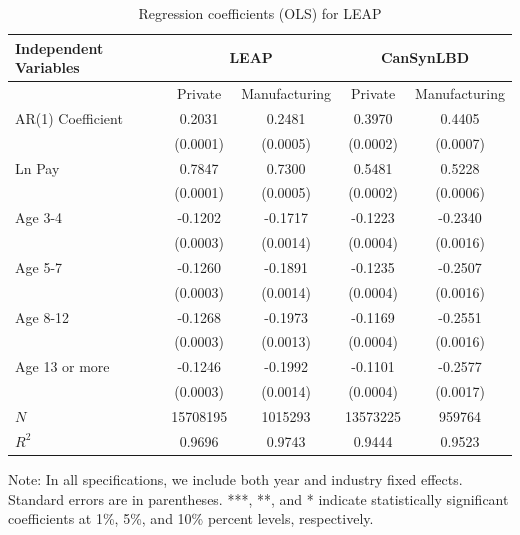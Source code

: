 \documentclass[10pt,twoside]{article}
\newcommand{\sym}[1]{\rlap{#1}}
\begin{document}
\begin{table}[H]
  \centering
\begin{threeparttable}
 \caption{Regression coefficients (OLS) for LEAP} \label{tab:OLS_can} \medskip
\renewcommand{\arraystretch}{1}
\begin{tabular}{l|c c| c c}
\toprule
\textbf{Independent Variables}&\multicolumn{2}{c|}{\textbf{LEAP}} &  \multicolumn{2}{c}{\textbf{CanSynLBD}}\\
\midrule
&\multicolumn{1}{c}{Private}&\multicolumn{1}{c}{Manufacturing}&\multicolumn{1}{c}{Private}&\multicolumn{1}{c}{Manufacturing}\\
\hline
AR(1) Coefficient&   0.2031\sym{***}&   0.2481\sym{***}&   0.3970\sym{***}&   0.4405\sym{***}\\
          & (0.0001)         & (0.0005)         & (0.0002)         & (0.0007)         \\
[1em]
Ln Pay    &   0.7847\sym{***}&   0.7300\sym{***}&   0.5481\sym{***}&   0.5228\sym{***}\\
          & (0.0001)         & (0.0005)         & (0.0002)         & (0.0006)         \\
[1em]
Age 3-4   &  -0.1202\sym{***}&  -0.1717\sym{***}&  -0.1223\sym{***}&  -0.2340\sym{***}\\
          & (0.0003)         & (0.0014)         & (0.0004)         & (0.0016)         \\
[1em]
Age 5-7   &  -0.1260\sym{***}&  -0.1891\sym{***}&  -0.1235\sym{***}&  -0.2507\sym{***}\\
          & (0.0003)         & (0.0014)         & (0.0004)         & (0.0016)         \\
[1em]
Age 8-12  &  -0.1268\sym{***}&  -0.1973\sym{***}&  -0.1169\sym{***}&  -0.2551\sym{***}\\
          & (0.0003)         & (0.0013)         & (0.0004)         & (0.0016)         \\
[1em]
Age 13 or more&  -0.1246\sym{***}&  -0.1992\sym{***}&  -0.1101\sym{***}&  -0.2577\sym{***}\\
          & (0.0003)         & (0.0014)         & (0.0004)         & (0.0017)         \\
\hline
\(N\)     & 15708195         &  1015293         & 13573225         &   959764         \\
\(R^{2}\) &   0.9696         &   0.9743         &   0.9444         &   0.9523         \\
 \bottomrule
\end{tabular} 
\begin{tablenotes}
\small
\item Note: In all specifications, we include both year and industry fixed effects. Standard errors are in parentheses.  ***, **, and * indicate statistically significant coefficients at 1\%, 5\%, and 10\% percent levels, respectively.
 \end{tablenotes}
 \end{threeparttable}
\end{table}
\end{document}

